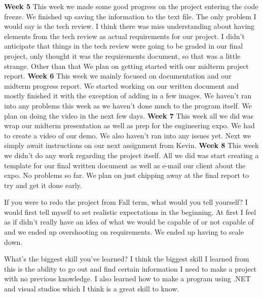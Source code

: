 \documentclass[onecolumn, draftclsnofoot,10pt, compsoc]{IEEEtran}
\begin{document}
\newline
\textbf{Week 5}
\newline
This week we made some good progress on the project entering the code freeze. We finished up saving the information to the text file. The only problem I would say is the tech review. I think there was miss understanding about having elements from the tech review as actual requirements for our project. I didn't anticipate that things in the tech review were going to be graded in our final project, only thought it was the requirements document, so that was a little strange. Other than that We plan on getting started with our midterm project report.
\newline
\textbf{Week 6}
\newline
This week we mainly focused on documentation and our midterm progress report. We started working on our written document and mostly finished it with the exception of adding in a few images. We haven't ran into any problems this week as we haven't done much to the program itself. We plan on doing the video in the next few days.
\newline
\textbf{Week 7}
\newline
This week all we did was wrap our midterm presentation as well as prep for the engineering expo. We had to create a video of our demo. We also haven't ran into any issues yet. Next we simply await instructions on our next assignment from Kevin.
\newline
\textbf{Week 8}
\newline
This week we didn't do any work regarding the project itself. All we did was start creating a template for our final written document as well as e-mail our client about the expo. No problems so far. We plan on just chipping away at the final report to try and get it done early.

If you were to redo the project from Fall term, what would you tell yourself? I would first tell myself to set realistic expectations in the beginning. At first I feel as if didn't really have an idea of what we would be capable of or not capable of and we ended up overshooting on requirements. We ended up having to scale down.

What's the biggest skill you've learned? I think the biggest skill I learned from this is the ability to go out and find certain information I need to make a project with no previous knowledge. I also learned how to make a program using .NET and visual studios which I think is a great skill to know.
\end{document}
